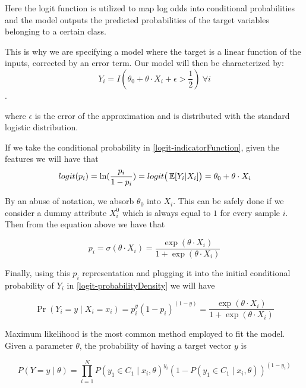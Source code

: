 Here the logit function is utilized to map log odds into conditional probabilities and the model outputs the predicted probabilities of the target variables belonging to a certain class.

This is why we are specifying a model where the target is a linear function of the inputs, corrected by an error term. Our model will then be characterized by:
\begin{equation}\label{logit-indicatorFunction}
Y_i = I(\theta_0 + \theta \cdot X_i + \epsilon > \frac{1}{2}) \ \forall i
\end{equation}.

where $\epsilon$ is the error of the approximation and is distributed with the standard logistic distribution. %

If we take the conditional probability in \cref{logit-indicatorFunction}, given the features we will have that
\begin{equation}
logit(p_i)= \ln(\frac{p_i}{1-p_i}) = logit\big( \operatorname{\mathbb{E}}[Y_i| X_i] \big) = \theta_0 + \theta \cdot X_i
\end{equation}

By an abuse of notation, we absorb $\theta_0$ into $X_i$. This can be safely done if we consider a dummy attribute $X_i^0$ which is always equal to $1$ for every sample $i$. Then from the equation above we have that

\begin{equation}
p_i = \sigma(\theta \cdot X_i) = \frac{\exp(\theta \cdot X_i) }{1 + \exp(\theta \cdot X_i)}
\end{equation}

Finally, using this $p_i$ representation and plugging it into the initial conditional probability of $Y_i$ in \cref{logit-probabilityDensity} we will have

\begin{equation}
 \Pr(Y_i=y \mid X_i = x_i) = p_i^{y} {(1-p_i)}^{(1-y)} = \frac{\exp(\theta \cdot X_i) }{1 + \exp(\theta \cdot X_i)}
 \end{equation}


Maximum likelihood is the most common method employed to fit the model. %
Given a parameter $\theta$, the probability of having a target vector $y$ is

\begin{equation}
P(Y =y \mid \theta ) = \prod_{i=1}^N {P(y_1 \in C_1 \mid x_i, \theta)}^{y_i} {(1 - P(y_1 \in C_1 \mid x_i, \theta) )}^{(1-y_i)}
\end{equation}

